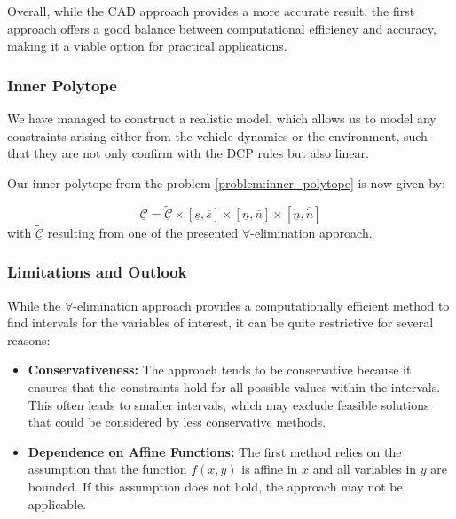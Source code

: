 Overall, while the CAD approach provides a more accurate result, the first approach offers a good balance between computational efficiency and
accuracy, making it a viable option for practical applications.

\subsubsection{Inner Polytope}

We have managed to construct a realistic model, which allows us to model any constraints arising either from the vehicle dynamics or the environment,
such that they are not only confirm with the DCP rules but also linear.

Our inner polytope from the problem \ref{problem:inner_polytope} is now given by:

\begin{equation}
	\label{eq:pm_coupling_constraints}
	\underline{\mathcal{C}} = \tilde{\underline{\mathcal{C}}} \times [\underline{s}, \overline{s}] \times [\underline{n}, \overline{n}] \times [\underline{\dot{n}}, \overline{\dot{n}}]
\end{equation}
with $\tilde{\underline{\mathcal{C}}}$ resulting from one of the presented $\forall$-elimination approach.

\subsubsection{Limitations and Outlook}

While the $\forall$-elimination approach provides a computationally efficient method to find intervals for the variables of interest, it can be quite restrictive for several reasons:

\begin{itemize}
	\item \textbf{Conservativeness:}
	      The approach tends to be conservative because it ensures that the constraints hold for all possible values within the intervals.
	      This often leads to smaller intervals, which may exclude feasible solutions that could be considered by less conservative methods.
	\item \textbf{Dependence on Affine Functions:}
	      The first method relies on the assumption that the function $f(x, y)$ is affine in $x$ and all variables in $y$ are bounded.
	      If this assumption does not hold, the approach may not be applicable.
\end{itemize}

